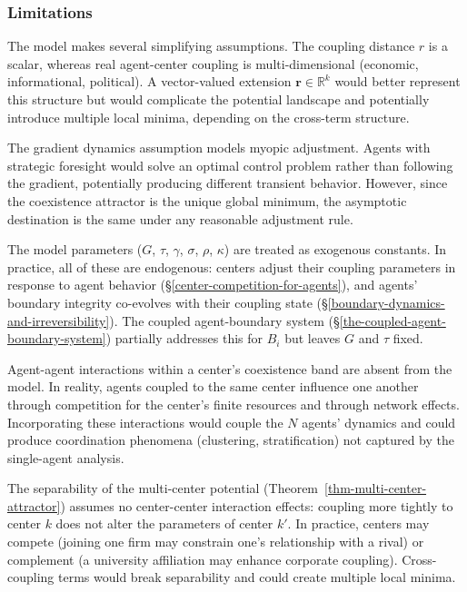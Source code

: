 \documentclass[11pt]{article}
\theoremstyle{plain}
\theoremstyle{definition}
\theoremstyle{remark}
\let\origsubsubsection\subsubsection
\renewcommand{\subsubsection}{\needspace{4\baselineskip}\origsubsubsection}
\begin{document}
\subsubsection{Limitations}\label{limitations-5}

The model makes several simplifying assumptions. The coupling distance
\(r\) is a scalar, whereas real agent-center coupling is
multi-dimensional (economic, informational, political). A vector-valued
extension \(\mathbf{r} \in \mathbb{R}^k\) would better represent this
structure but would complicate the potential landscape and potentially
introduce multiple local minima, depending on the cross-term structure.

The gradient dynamics assumption models myopic adjustment. Agents with
strategic foresight would solve an optimal control problem rather than
following the gradient, potentially producing different transient
behavior. However, since the coexistence attractor is the unique global
minimum, the asymptotic destination is the same under any reasonable
adjustment rule.

The model parameters (\(G\), \(\tau\), \(\gamma\), \(\sigma\), \(\rho\),
\(\kappa\)) are treated as exogenous constants. In practice, all of
these are endogenous: centers adjust their coupling parameters in
response to agent behavior (§\ref{center-competition-for-agents}), and
agents' boundary integrity co-evolves with their coupling state
(§\ref{boundary-dynamics-and-irreversibility}). The coupled
agent-boundary system (§\ref{the-coupled-agent-boundary-system})
partially addresses this for \(B_i\) but leaves \(G\) and \(\tau\)
fixed.

Agent-agent interactions within a center's coexistence band are absent
from the model. In reality, agents coupled to the same center influence
one another through competition for the center's finite resources and
through network effects. Incorporating these interactions would couple
the \(N\) agents' dynamics and could produce coordination phenomena
(clustering, stratification) not captured by the single-agent analysis.

The separability of the multi-center potential
(Theorem~\ref{thm-multi-center-attractor}) assumes no center-center
interaction effects: coupling more tightly to center \(k\) does not
alter the parameters of center \(k'\). In practice, centers may compete
(joining one firm may constrain one's relationship with a rival) or
complement (a university affiliation may enhance corporate coupling).
Cross-coupling terms would break separability and could create multiple
local minima.
\end{document}
